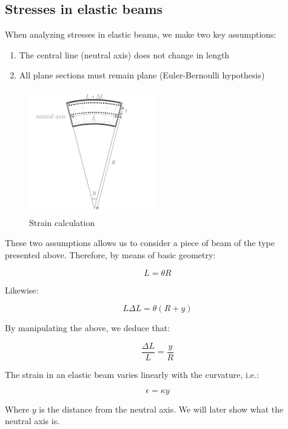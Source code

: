 \documentclass{article}
\begin{document}
\newpage

\subsection{Stresses in elastic beams}

When analyzing stresses in elastic beams, we make two key assumptions:

\begin{enumerate}
    \item The central line (neutral axis) does not change in length
    \item All plane sections must remain plane (Euler-Bernoulli hypothesis)
\end{enumerate}

\begin{figure}[h]
    \centering
    \includegraphics[width = 0.5\textwidth]{images/strains.png}
    \caption{Strain calculation}
    \label{fig:enter-label}
\end{figure}

These two assumptions allows us to consider a piece of beam of the type presented above. Therefore, by means of basic geometry:

\[ L = \theta R \]

Likewise:

\[ L \Delta L = \theta(R + y) \]

By manipulating the above, we deduce that:

\[ \frac{\Delta L}{L} = \frac{y}{R} \]

\begin{proposition}
    The strain in an elastic beam varies linearly with the curvature, i.e.:

    \[ \epsilon = \kappa y \]

    Where $y$ is the distance from the neutral axis. We will later show what the neutral axis is.
\end{proposition}
\end{document}
